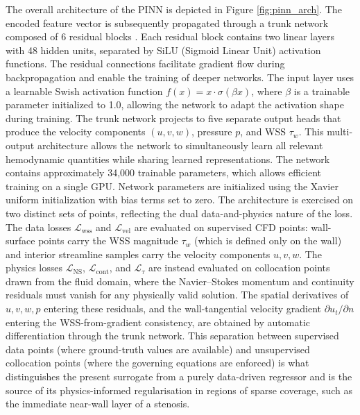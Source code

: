 ﻿\documentclass[12pt,a4paper]{article}
\newcommand{\added}[2][]{\begingroup\color{red}#2\endgroup}
\newcommand{\addp}[1]{\added{#1}}
\theoremstyle{definition}
\numberwithin{equation}{section}
\begin{document}
{The overall architecture of the PINN is depicted in Figure \ref{fig:pinn_arch}. The encoded feature vector is subsequently propagated through a trunk network composed of {6} residual blocks \cite{100,99}. Each residual block contains two linear layers with {48} hidden units, separated by SiLU (Sigmoid Linear Unit) activation functions. The residual connections facilitate gradient flow during backpropagation and enable the training of deeper networks. The input layer uses a learnable Swish activation function $f(x) = x \cdot \sigma(\beta x)$, where $\beta$ is a trainable parameter initialized to 1.0, allowing the network to adapt the activation shape during training. The trunk network projects to five separate output heads that produce the velocity components $(u, v, w)$, pressure $p$, and WSS $\tau_w$. This multi-output architecture allows the network to simultaneously learn all relevant hemodynamic quantities while sharing learned representations. The network contains approximately {34,000} trainable parameters, which allows efficient training on a single GPU. {Network parameters are initialized using the Xavier uniform initialization \cite{91} with bias terms set to zero.} \addp{The architecture is exercised on two distinct sets of points, reflecting the dual data-and-physics nature of the loss. The data losses $\mathcal{L}_{\text{wss}}$ and $\mathcal{L}_{\text{vel}}$ are evaluated on supervised CFD points: wall-surface points carry the WSS magnitude $\tau_w$ (which is defined only on the wall) and interior streamline samples carry the velocity components $u, v, w$. The physics losses $\mathcal{L}_{\text{NS}}$, $\mathcal{L}_{\text{cont}}$, and $\mathcal{L}_{\tau}$ are instead evaluated on collocation points drawn from the fluid domain, where the Navier--Stokes momentum and continuity residuals must vanish for any physically valid solution. The spatial derivatives of $u, v, w, p$ entering these residuals, and the wall-tangential velocity gradient $\partial u_t/\partial n$ entering the WSS-from-gradient consistency, are obtained by automatic differentiation through the trunk network. This separation between supervised data points (where ground-truth values are available) and unsupervised collocation points (where the governing equations are enforced) is what distinguishes the present surrogate from a purely data-driven regressor and is the source of its physics-informed regularisation in regions of sparse coverage, such as the immediate near-wall layer of a stenosis.}
}
\end{document}
